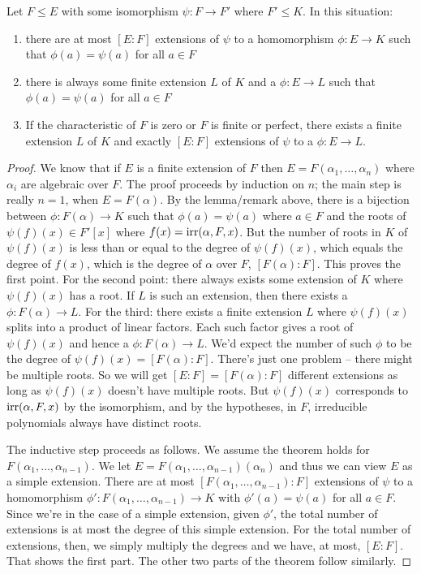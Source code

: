 \documentclass{../mathnotes}
\begin{document}
\begin{thm}
    Let $F\leq E$ with some isomorphism $\psi:F\to F'$ where $F'\leq K$. In this situation:
    \begin{enumerate}
        \item there are at most $[E:F]$ extensions of $\psi$ to a homomorphism $\phi:E\to K$ such that $\phi(a)=\psi(a)$ for all $a\in F$
        \item there is always some finite extension $L$ of $K$ and a $\phi:E\to L$ such that $\phi(a)=\psi(a)$ for all $a\in F$
        \item If the characteristic of $F$ is zero or $F$ is finite or perfect, there exists a finite extension $L$ of $K$
            and exactly $[E:F]$ extensions of $\psi$ to a $\phi:E\to L$.
    \end{enumerate}
\end{thm}
\begin{proof}
    We know that if $E$ is a finite extension of $F$ then $E=F(\alpha_1,\ldots,\alpha_n)$ where $\alpha_i$
    are algebraic over $F$. The proof proceeds by induction on $n$; the main step is really $n=1$, when
    $E=F(\alpha)$. By the lemma/remark above, there is a bijection between $\phi:F(\alpha)\to K$ such that $\phi(a)=\psi(a)$
    where $a\in F$ and the roots of $\psi(f)(x)\in F'[x]$ where $f(x)=\operatorname{irr}(\alpha,F,x)$. But the number
    of roots in $K$ of $\psi(f)(x)$ is less than or equal to the degree of $\psi(f)(x)$, which equals the degree of $f(x)$,
    which is the degree of $\alpha$ over $F$, $[F(\alpha):F]$. This proves the first point. For the second point: there always exists
    some extension of $K$ where $\psi(f)(x)$ has a root. If $L$ is such an extension, then there exists a $\phi:F(\alpha)\to L$.
    For the third: there exists a finite extension $L$ where $\psi(f)(x)$ splits into a product of linear factors. Each such factor
    gives a root of $\psi(f)(x)$ and hence a $\phi:F(\alpha)\to L$. We'd expect the number of such $\phi$ to be the degree
    of $\psi(f)(x)=[F(\alpha):F]$. There's just one problem -- there might be multiple roots. So we will get $[E:F]=[F(\alpha):F]$
    different extensions as long as $\psi(f)(x)$ doesn't have multiple roots. But $\psi(f)(x)$ corresponds to $\operatorname{irr}(\alpha,F,x)$
    by the isomorphism, and by the hypotheses, in $F$, irreducible polynomials always have distinct roots.

    The inductive step proceeds as follows. We assume the theorem holds for $F(\alpha_1,\ldots,\alpha_{n-1})$.
    We let $E=F(\alpha_1,\ldots,\alpha_{n-1})(\alpha_n)$ and thus we can view $E$ as a simple extension. 
    There are at most $[F(\alpha_1,\ldots,\alpha_{n-1}):F]$ extensions of $\psi$ to a homomorphism
    $\phi':F(\alpha_1,\ldots,\alpha_{n-1})\to K$ with $\phi'(a)=\psi(a)$ for all $a\in F$. Since we're
    in the case of a simple extension, given $\phi'$, the total number of extensions is at most the degree
    of this simple extension. For the total number of extensions, then, we simply multiply the degrees and
    we have, at most, $[E:F]$. That shows the first part. The other two parts of the theorem follow similarly.
\end{proof}
\end{document}
